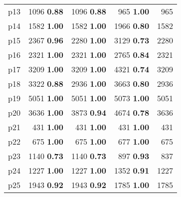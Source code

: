 \begin{tabular}{lrrrr}
\multicolumn{1}{l|}{p13} & {\footnotesize 1096} \textbf{0.88} & {\footnotesize 1096} \textbf{0.88} & {\footnotesize 965} \textbf{1.00} & \multicolumn{1}{|r}{965}\\
\multicolumn{1}{l|}{p14} & {\footnotesize 1582} \textbf{1.00} & {\footnotesize 1582} \textbf{1.00} & {\footnotesize 1966} \textbf{0.80} & \multicolumn{1}{|r}{1582}\\
\multicolumn{1}{l|}{p15} & {\footnotesize 2367} \textbf{0.96} & {\footnotesize 2280} \textbf{1.00} & {\footnotesize 3129} \textbf{0.73} & \multicolumn{1}{|r}{2280}\\
\multicolumn{1}{l|}{p16} & {\footnotesize 2321} \textbf{1.00} & {\footnotesize 2321} \textbf{1.00} & {\footnotesize 2765} \textbf{0.84} & \multicolumn{1}{|r}{2321}\\
\multicolumn{1}{l|}{p17} & {\footnotesize 3209} \textbf{1.00} & {\footnotesize 3209} \textbf{1.00} & {\footnotesize 4321} \textbf{0.74} & \multicolumn{1}{|r}{3209}\\
\multicolumn{1}{l|}{p18} & {\footnotesize 3322} \textbf{0.88} & {\footnotesize 2936} \textbf{1.00} & {\footnotesize 3663} \textbf{0.80} & \multicolumn{1}{|r}{2936}\\
\multicolumn{1}{l|}{p19} & {\footnotesize 5051} \textbf{1.00} & {\footnotesize 5051} \textbf{1.00} & {\footnotesize 5073} \textbf{1.00} & \multicolumn{1}{|r}{5051}\\
\multicolumn{1}{l|}{p20} & {\footnotesize 3636} \textbf{1.00} & {\footnotesize 3873} \textbf{0.94} & {\footnotesize 4674} \textbf{0.78} & \multicolumn{1}{|r}{3636}\\
\multicolumn{1}{l|}{p21} & {\footnotesize 431} \textbf{1.00} & {\footnotesize 431} \textbf{1.00} & {\footnotesize 431} \textbf{1.00} & \multicolumn{1}{|r}{431}\\
\multicolumn{1}{l|}{p22} & {\footnotesize 675} \textbf{1.00} & {\footnotesize 675} \textbf{1.00} & {\footnotesize 677} \textbf{1.00} & \multicolumn{1}{|r}{675}\\
\multicolumn{1}{l|}{p23} & {\footnotesize 1140} \textbf{0.73} & {\footnotesize 1140} \textbf{0.73} & {\footnotesize 897} \textbf{0.93} & \multicolumn{1}{|r}{837}\\
\multicolumn{1}{l|}{p24} & {\footnotesize 1227} \textbf{1.00} & {\footnotesize 1227} \textbf{1.00} & {\footnotesize 1352} \textbf{0.91} & \multicolumn{1}{|r}{1227}\\
\multicolumn{1}{l|}{p25} & {\footnotesize 1943} \textbf{0.92} & {\footnotesize 1943} \textbf{0.92} & {\footnotesize 1785} \textbf{1.00} & \multicolumn{1}{|r}{1785}\\

\end{tabular}

